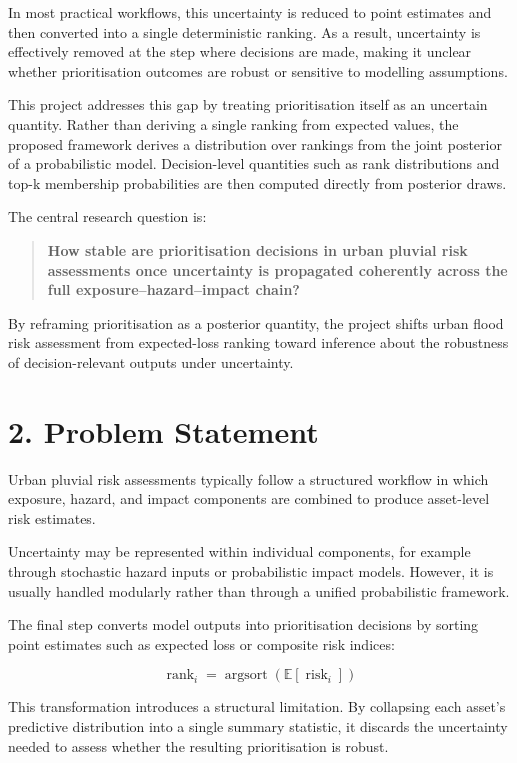 \documentclass[
]{article}
\begin{document}
In most practical workflows, this uncertainty is reduced to point
estimates and then converted into a single deterministic ranking. As a
result, uncertainty is effectively removed at the step where decisions
are made, making it unclear whether prioritisation outcomes are robust
or sensitive to modelling assumptions.

This project addresses this gap by treating prioritisation itself as an
uncertain quantity. Rather than deriving a single ranking from expected
values, the proposed framework derives a distribution over rankings from
the joint posterior of a probabilistic model. Decision-level quantities
such as rank distributions and top-k membership probabilities are then
computed directly from posterior draws.

The central research question is:

\begin{quote}
\textbf{How stable are prioritisation decisions in urban pluvial risk
assessments once uncertainty is propagated coherently across the full
exposure--hazard--impact chain?}
\end{quote}

By reframing prioritisation as a posterior quantity, the project shifts
urban flood risk assessment from expected-loss ranking toward inference
about the robustness of decision-relevant outputs under uncertainty.

\section{2. Problem Statement}\label{problem-statement}

Urban pluvial risk assessments typically follow a structured workflow in
which exposure, hazard, and impact components are combined to produce
asset-level risk estimates.

Uncertainty may be represented within individual components, for example
through stochastic hazard inputs or probabilistic impact models.
However, it is usually handled modularly rather than through a unified
probabilistic framework.

The final step converts model outputs into prioritisation decisions by
sorting point estimates such as expected loss or composite risk indices:

\[
\operatorname{rank}_i = \operatorname{argsort}\!\left(\mathbb{E}[\operatorname{risk}_i]\right)
\]

This transformation introduces a structural limitation. By collapsing
each asset's predictive distribution into a single summary statistic, it
discards the uncertainty needed to assess whether the resulting
prioritisation is robust.
\end{document}
